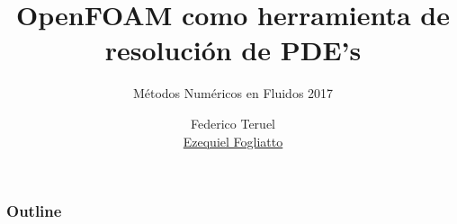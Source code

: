 \documentclass{beamer}
\author[Fogliatto, E.]{Federico Teruel \\ \underline{Ezequiel Fogliatto}}
\title[OpenFOAM\textsuperscript{\textregistered} para PDE's]{OpenFOAM\textsuperscript{\textregistered} como herramienta de resoluci\'on de PDE's}
\subtitle{M\'etodos Num\'ericos en Fluidos 2017}
\institute[MECOM-IB]{Departamento de Mec\'anica Computacional - Centro At\'omico Bariloche \and Instituto Balseiro}
\begin{document}
\renewcommand{\tablename}{Tabla}
\newcommand{\bs}[1]{\boldsymbol{#1}}

    \begin{frame}
        \titlepage
    \end{frame}

    \begin{frame}
        \frametitle{Outline}
        \tableofcontents
    \end{frame}
    








        

    
\end{document}
